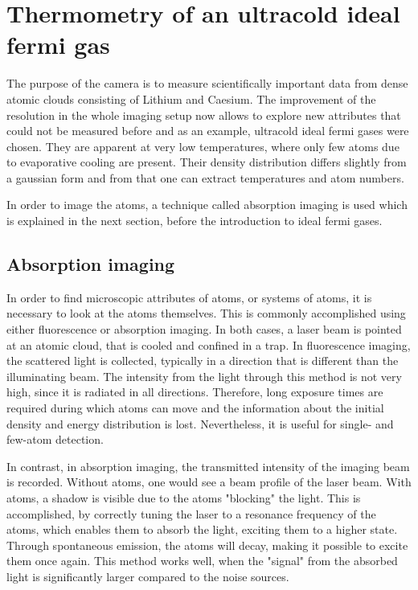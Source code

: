 \chapter{Thermometry of an ultracold ideal fermi gas}
The purpose of the camera is to measure scientifically important data from dense atomic clouds consisting of Lithium and Caesium.
The improvement of the resolution in the whole imaging setup now allows to explore new attributes that could not be measured before and as an example, ultracold ideal fermi gases were chosen. They are apparent at very low temperatures, where only few atoms due to evaporative cooling are present. Their density distribution differs slightly from a gaussian form and from that one can extract temperatures and atom numbers.

In order to image the atoms, a technique called absorption imaging is used which is explained in the next section, before the introduction to ideal fermi gases.

\section{Absorption imaging}
In order to find microscopic attributes of atoms, or systems of atoms, it is necessary to look at the atoms themselves. This is commonly accomplished using either fluorescence or absorption imaging\cite{Murmann2011}. In both cases, a laser beam is pointed at an atomic cloud, that is cooled and confined in a trap. In fluorescence imaging, the scattered light is collected, typically in a direction that is different than the illuminating beam.
The intensity from the light through this method is not very high, since it is radiated in all directions. Therefore, long exposure times are required during which atoms can move and the information about the initial density and energy distribution is lost. Nevertheless, it is useful for single- and few-atom detection. 

In contrast, in absorption imaging\cite{helmrich2013}, the transmitted intensity of the imaging beam is recorded. Without atoms, one would see a beam profile of the laser beam. With atoms, a shadow is visible due to the atoms "blocking" the light. This is accomplished, by correctly tuning the laser to a resonance frequency of the atoms, which enables them to absorb the light, exciting them to a higher state. Through spontaneous emission, the atoms will decay, making it possible to excite them once again. This method works well, when the "signal" from the absorbed light is significantly larger compared to the noise sources.

